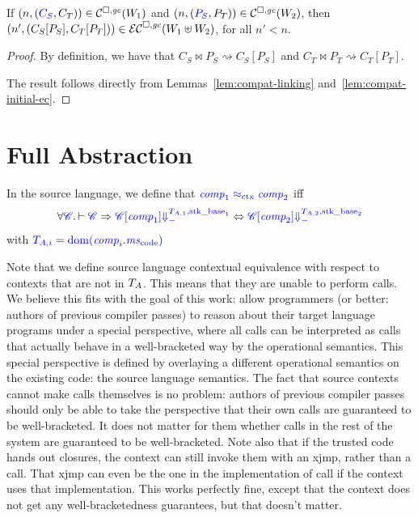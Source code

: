 \documentclass[a4paper]{article}
\begin{document}
\begin{lemma}
  \label{lem:compat-context-plug}
  If $\npair{\stpair{C}{C}}\in\lrcomp(W_1)$ and $\npair{\stpair{P}{P}} \in \lrcomp(W_2)$, then
  $\npair[n']{(\plug{C_S}{P_S},\plug{C_T}{P_T})} \in \lrec(W_1 \uplus W_2)$, for all $n' < n$.
\end{lemma}
\begin{proof}
  By definition, we have that $C_S \bowtie P_S \rightsquigarrow C_S[P_S]$ and $C_T \bowtie P_T \rightsquigarrow C_T[P_T]$.

  The result follows directly from Lemmas~\ref{lem:compat-linking} and~\ref{lem:compat-initial-ec}.
\end{proof}

\section{Full Abstraction}
\label{sec:full-abstraction}
\begin{definition}
  In the source language, we define that $\src{\var{comp}_1 \sconeq \var{comp}_2}$ iff
  \begin{equation*}
    \forall \src{\context} \ldotp \vdash \src{\context} \Rightarrow \src{\plug{\context}{\var{comp}_1} \sterm{\ta[,1],\stkb_1}} \Leftrightarrow \src{\plug{\context}{\var{comp}_2} \sterm{\ta[,2],\stkb_2}}
  \end{equation*}
  with $\src{\ta[,i]} = \src{\dom(\var{comp}_i.\mscode)}$
\end{definition}

Note that we define source language contextual equivalence with respect to contexts that are not in $\ta$.
This means that they are unable to perform calls.
We believe this fits with the goal of this work: allow programmers (or better: authors of previous compiler passes) to reason about their target language programs under a special perspective, where all calls can be interpreted as calls that actually behave in a well-bracketed way by the operational semantics.
This special perspective is defined by overlaying a different operational semantics on the existing code: the source language semantics.
The fact that source contexts cannot make calls themselves is no problem: authors of previous compiler passes should only be able to take the perspective that their own calls are guaranteed to be well-bracketed.
It does not matter for them whether calls in the rest of the system are guaranteed to be well-bracketed.
Note also that if the trusted code hands out closures, the context can still invoke them with an xjmp, rather than a call.
That xjmp can even be the one in the implementation of call if the context uses that implementation. 
This works perfectly fine, except that the context does not get any well-bracketedness guarantees, but that doesn't matter.
\end{document}

